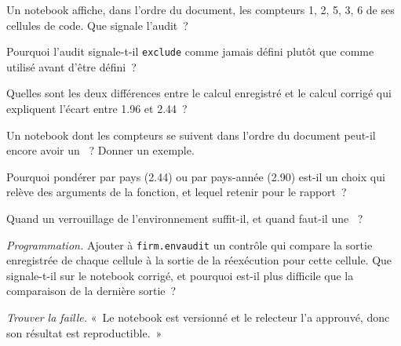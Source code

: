 \begin{exercise}[$\star$]\label{exo:pl:the-research-environment:1}
Un notebook affiche, dans l'ordre du document, les compteurs 1, 2, 5, 3, 6 de ses cellules de code. Que signale l'audit~?
\end{exercise}

\begin{exercise}[$\star$]\label{exo:pl:the-research-environment:2}
Pourquoi l'audit signale-t-il \texttt{exclude} comme jamais défini plutôt que comme utilisé avant d'être défini~?
\end{exercise}

\begin{exercise}[$\star$]\label{exo:pl:the-research-environment:3}
Quelles sont les deux différences entre le calcul enregistré et le calcul corrigé qui expliquent l'écart entre 1.96 et 2.44~?
\end{exercise}

\begin{exercise}[$\star\star$]\label{exo:pl:the-research-environment:4}
Un notebook dont les compteurs se suivent dans l'ordre du document peut-il encore avoir un ~? Donner un exemple.
\end{exercise}

\begin{exercise}[$\star\star$]\label{exo:pl:the-research-environment:5}
Pourquoi pondérer par pays (2.44) ou par pays-année (2.90) est-il un choix qui relève des arguments de la fonction, et lequel retenir pour le rapport~?
\end{exercise}

\begin{exercise}[$\star\star$]\label{exo:pl:the-research-environment:6}
Quand un verrouillage de l'environnement suffit-il, et quand faut-il une ~?
\end{exercise}

\begin{exercise}[$\star\star\star$]\label{exo:pl:the-research-environment:7}
\emph{Programmation.} Ajouter à \texttt{firm.envaudit} un contrôle qui compare la sortie enregistrée de chaque cellule à la sortie de la réexécution pour cette cellule. Que
signale-t-il sur le notebook corrigé, et pourquoi est-il plus difficile que la comparaison de la dernière sortie~?
\end{exercise}

\begin{exercise}[$\star\star\star$]\label{exo:pl:the-research-environment:8}
\emph{Trouver la faille.} «~Le notebook est versionné et le relecteur l'a approuvé, donc son résultat est reproductible.~»
\end{exercise}

